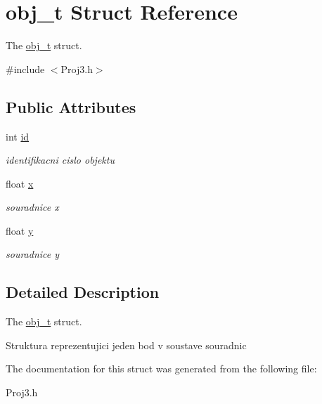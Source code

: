 \hypertarget{structobj__t}{}\section{obj\+\_\+t Struct Reference}
\label{structobj__t}


The \hyperlink{structobj__t}{obj\+\_\+t} struct.  




{\ttfamily \#include $<$Proj3.\+h$>$}

\subsection*{Public Attributes}
\begin{DoxyCompactItemize}
\item 
\hypertarget{structobj__t_a603ae185ae536cecefa2015ad574d4a3}{}\label{structobj__t_a603ae185ae536cecefa2015ad574d4a3} 
int \hyperlink{structobj__t_a603ae185ae536cecefa2015ad574d4a3}{id}
\begin{DoxyCompactList}\small\item\em identifikacni cislo objektu \end{DoxyCompactList}\item 
\hypertarget{structobj__t_af688845648ce2b4781c232c475d9fa81}{}\label{structobj__t_af688845648ce2b4781c232c475d9fa81} 
float \hyperlink{structobj__t_af688845648ce2b4781c232c475d9fa81}{x}
\begin{DoxyCompactList}\small\item\em souradnice x \end{DoxyCompactList}\item 
\hypertarget{structobj__t_a1101f5b48ee96a247c71aa8a33feb2bb}{}\label{structobj__t_a1101f5b48ee96a247c71aa8a33feb2bb} 
float \hyperlink{structobj__t_a1101f5b48ee96a247c71aa8a33feb2bb}{y}
\begin{DoxyCompactList}\small\item\em souradnice y \end{DoxyCompactList}\end{DoxyCompactItemize}


\subsection{Detailed Description}
The \hyperlink{structobj__t}{obj\+\_\+t} struct. 

Struktura reprezentujici jeden bod v soustave souradnic 

The documentation for this struct was generated from the following file\+:\begin{DoxyCompactItemize}
\item 
Proj3.\+h\end{DoxyCompactItemize}
